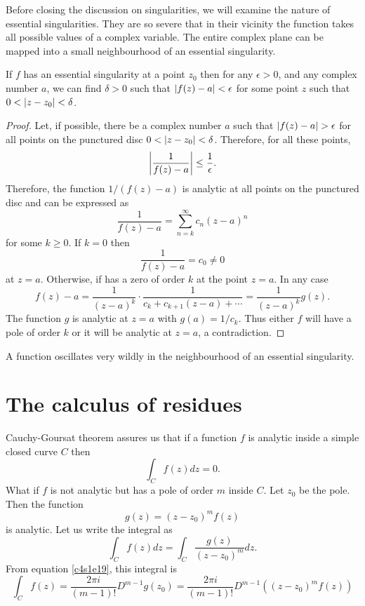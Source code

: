 Before closing the discussion on singularities, we will examine the nature of 
essential singularities. They are so severe that in their vicinity the function
takes all possible values of a complex variable. The entire complex plane can be
mapped into a small neighbourhood of an essential singularity.


\begin{thm}\label{c5s2t1}
If $f$ has an essential singularity at a point $z_0$ then for any $\epsilon > 0$,
and any complex number $a$, we can find $\delta > 0$ such that $\left\vert{f(z) - a}\right\vert <
\epsilon$ for some point $z$ such that $0 < \left\vert{z - z_0}\right\vert < \delta$.
\end{thm}
\begin{proof}
Let, if possible, there be a complex number $a$ such that $\left\vert{f(z) - a}\right\vert > 
\epsilon$ for all points on the punctured disc $0 < \left\vert{z - z_0}\right\vert < \delta$.
Therefore, for all these points,
\[
\left\vert{\frac{1}{f(z) - a}}\right\vert \le \frac{1}{\epsilon}.
\]
Therefore, the function $1/(f(z) - a)$ is analytic at all points on the 
punctured disc and can be expressed as
\[
\frac{1}{f(z) - a} = \sum_{n = k}^\infty c_n(z - a)^n 
\]
for some $k \ge 0$. If $k = 0$ then
\[
\frac{1}{f(z) - a} = c_0 \ne 0
\] 
at $z = a$. Otherwise, if has a zero of order $k$ at the point $z=a$. In any 
case
\[
f(z) - a = \frac{1}{(z - a)^k}\cdot\frac{1}{c_k + c_{k+1}(z-a) + \cdots} = 
\frac{1}{(z - a)^k}g(z).
\]
The function $g$ is analytic at $z = a$ with $g(a) = 1/c_k$. Thus either $f$
will have a pole of order $k$ or it will be analytic at $z = a$, a contradiction.
\end{proof}

\begin{rem}
A function oscillates very wildly in the neighbourhood of an essential singularity.
\end{rem}

\section{The calculus of residues}\label{c5s3}
Cauchy-Goursat theorem assures us that if a function $f$ is analytic inside a simple
closed curve $C$ then
\[
\int_C f(z)dz = 0.
\]
What if $f$ is not analytic but has a pole of order $m$ inside $C$. Let $z_0$
be the pole. Then the function
\[
g(z) = (z - z_0)^mf(z)
\]
is analytic. Let us write the integral as
\[
\int_C f(z)dz = \int_C \frac{g(z)}{(z - z_0)^m}dz.
\]
From equation \eqref{c4s1e19}, this integral is
\begin{equation}\label{c5s3e1}
\int_C f(z) = \frac{2\pi i}{(m-1)!}D^{m-1}g(z_0) = 
\frac{2\pi i}{(m-1)!}D^{m-1}((z - z_0)^mf(z))
\end{equation}

